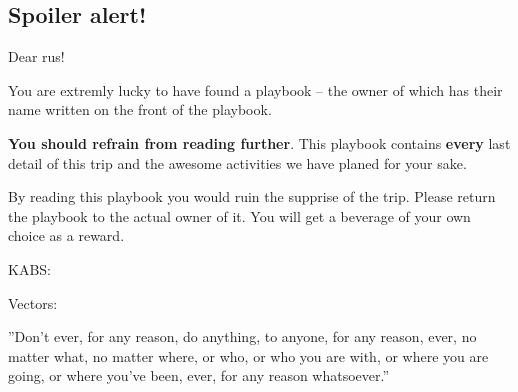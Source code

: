 \documentclass[../../main.tex]{subfiles}
\begin{document}
\begin{center}
\section*{{\color{red} {\Huge Spoiler alert!}}}
\end{center}
{ \large
Dear rus!

You are extremly lucky to have found a playbook -- the owner of which has their name written on the front of the playbook.

\textbf{You should refrain from reading further}. This playbook contains \textbf{every} last detail of this trip and the awesome activities we have planed for your sake.

By reading this playbook you would ruin the supprise of the trip. Please return the playbook to the actual owner of it. You will get a beverage of your own choice as a reward.

}
\begin{center}

{\huge KABS:


\KABS

\KABSEKS
}

\vspace*{3em}

{\huge Vectors: 


\VEKTOREX
}

\end{center}
\vfill
\begin{center}
    {\large ''Don't ever, for any reason, do anything, to anyone, for any reason, ever, no matter what, no matter where, or who, or who you are with, or where you are going, or where you've been, ever, for any reason whatsoever.''}
\end{center}
\newpage
\end{document}
